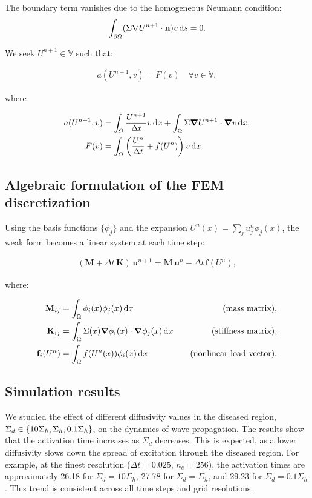 \documentclass[unicode,11pt,a4paper,oneside,numbers=endperiod,openany]{article}
\begin{document}
The boundary term vanishes due to the homogeneous Neumann condition:
\[
	\int_{\partial \Omega} (\Sigma \nabla U^{n+1} \cdot \mathbf{n}) v \,\diffd s = 0.
\]

We seek $U^{n+1} \in \mathbb{V}$ such that:

\begin{align*}
	a(U^{n+1}, v) = F(v) \quad \forall v \in \mathbb{V},
\end{align*}

where

\begin{align*}
	a(U^{n+1}, v) & = \int_\Omega \frac{U^{n+1}}{\Delta t} v\,\diffd x
	+ \int_\Omega \Sigma \grad U^{n+1} \cdot \grad v\,\diffd x,                             \\
	F(v)          & = \int_\Omega \left( \frac{U^n}{\Delta t} + f(U^n) \right) v\,\diffd x.
\end{align*}


\subsection{Algebraic formulation of the FEM discretization}

Using the basis functions $\{\phi_j\}$ and the expansion $U^n(x) = \sum_j u_j^n \phi_j(x)$, the weak form becomes a linear system at
each time step:

\begin{align*}
	(\mathbf M + \Delta t\, \mathbf K)\, \mathbf u^{n+1} = \mathbf M\, \mathbf u^n - \Delta t\, \mathbf f(U^n),
\end{align*}

where:

\begin{align*}
	\mathbf M_{ij}   & = \int_\Omega \phi_i(x) \phi_j(x)\,\diffd x \quad                             & \text{(mass matrix)},           \\
	\mathbf K_{ij}   & = \int_\Omega \Sigma(x) \grad \phi_i(x) \cdot \grad \phi_j(x)\,\diffd x \quad & \text{(stiffness matrix)},      \\
	\mathbf f_i(U^n) & = \int_\Omega f(U^n(x)) \phi_i(x)\,\diffd x \quad                             & \text{(nonlinear load vector)}.
\end{align*}

\subsection{Simulation results}

We studied the effect of different diffusivity values in the diseased region,
$\Sigma_d \in \qty{10\Sigma_h, \Sigma_h, 0.1\Sigma_h}$, on the dynamics of wave
propagation. The results show that the activation time increases as $\Sigma_d$
decreases. This is expected, as a lower diffusivity slows down the spread of
excitation through the diseased region. For example, at the finest resolution
($\Delta t = 0.025$, $n_e = 256$), the activation times are approximately 26.18
for $\Sigma_d = 10\Sigma_h$, 27.78 for $\Sigma_d = \Sigma_h$, and 29.23 for
$\Sigma_d = 0.1\Sigma_h$. This trend is consistent across all time steps and
grid resolutions.
\end{document}
